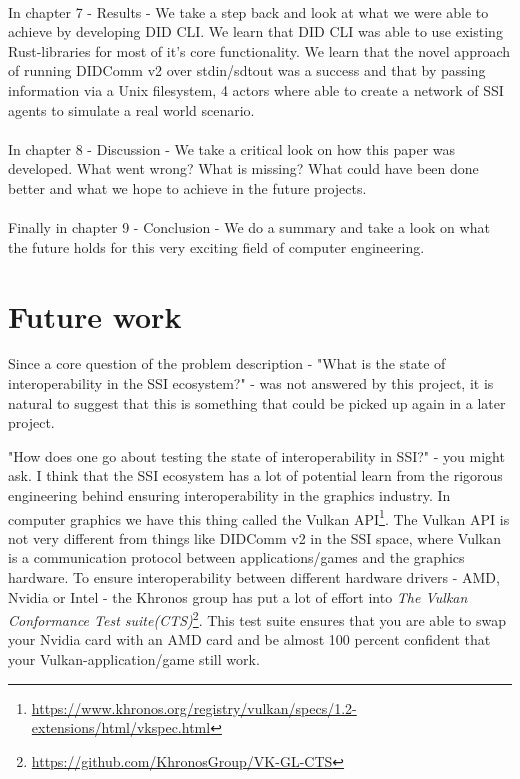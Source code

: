 \paragraph{}
In chapter 7 - Results - We take a step back and look at what we were able to achieve by developing DID CLI. We learn that DID CLI was able to use existing Rust-libraries for most of it's core functionality. We learn that the novel approach of running DIDComm v2 over stdin/sdtout was a success and that by passing information via a Unix filesystem, 4 actors where able to create a network of SSI agents to simulate a real world scenario.


\paragraph{}
In chapter 8 - Discussion - We take a critical look on how this paper was developed. What went wrong? What is missing? What could have been done better and what we hope to achieve in the future projects.


\paragraph{}
Finally in chapter 9 - Conclusion - We do a summary and take a look on what the future holds for this very exciting field of computer engineering.

\section{Future work}

Since a core question of the problem description - "What is the state of interoperability in the SSI ecosystem?" - was not answered by this project, it is natural to suggest that this is something that could be picked up again in a later project.

"How does one go about testing the state of interoperability in SSI?" - you might ask. I think that the SSI ecosystem has a lot of potential learn from the rigorous engineering behind ensuring interoperability in the graphics industry. In computer graphics we have this thing called the Vulkan API\footnote{\url{https://www.khronos.org/registry/vulkan/specs/1.2-extensions/html/vkspec.html}}. The Vulkan API is not very different from things like DIDComm v2 in the SSI space, where Vulkan is a communication protocol between applications/games and the graphics hardware. To ensure interoperability between different hardware drivers - AMD, Nvidia or Intel - the Khronos group has put a lot of effort into \textit{The Vulkan Conformance Test suite(CTS)}\footnote{\url{https://github.com/KhronosGroup/VK-GL-CTS}}. This test suite ensures that you are able to swap your Nvidia card with an AMD card and be almost 100 percent confident that your Vulkan-application/game still work.

